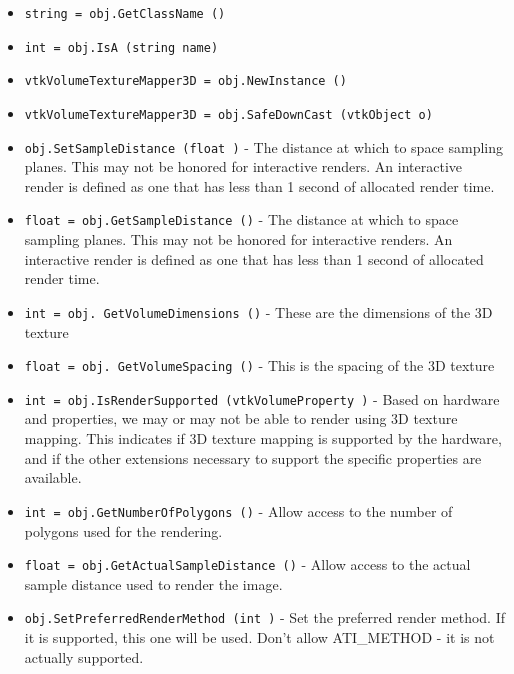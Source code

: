 \begin{itemize}
\item  \verb|string = obj.GetClassName ()|

\item  \verb|int = obj.IsA (string name)|

\item  \verb|vtkVolumeTextureMapper3D = obj.NewInstance ()|

\item  \verb|vtkVolumeTextureMapper3D = obj.SafeDownCast (vtkObject o)|

\item  \verb|obj.SetSampleDistance (float )| -  The distance at which to space sampling planes. This
 may not be honored for interactive renders. An interactive
 render is defined as one that has less than 1 second of
 allocated render time.

\item  \verb|float = obj.GetSampleDistance ()| -  The distance at which to space sampling planes. This
 may not be honored for interactive renders. An interactive
 render is defined as one that has less than 1 second of
 allocated render time.

\item  \verb|int = obj. GetVolumeDimensions ()| -  These are the dimensions of the 3D texture

\item  \verb|float = obj. GetVolumeSpacing ()| -  This is the spacing of the 3D texture

\item  \verb|int = obj.IsRenderSupported (vtkVolumeProperty )| -  Based on hardware and properties, we may or may not be able to
 render using 3D texture mapping. This indicates if 3D texture
 mapping is supported by the hardware, and if the other extensions
 necessary to support the specific properties are available.

\item  \verb|int = obj.GetNumberOfPolygons ()| -  Allow access to the number of polygons used for the
 rendering.

\item  \verb|float = obj.GetActualSampleDistance ()| -  Allow access to the actual sample distance used to render
 the image.

\item  \verb|obj.SetPreferredRenderMethod (int )| -  Set the preferred render method. If it is supported, this
 one will be used. Don't allow ATI\_METHOD - it is not actually
 supported.


\end{itemize}

